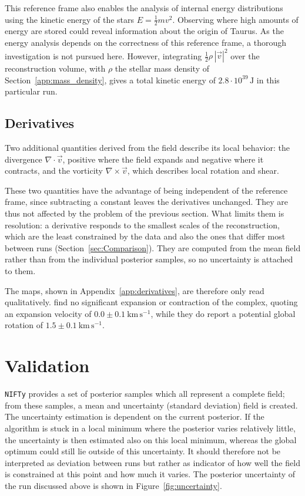 This reference frame also enables the analysis of internal energy distributions using the kinetic energy of the stars $E=\tfrac{1}{2}mv^2$.
Observing where high amounts of energy are stored could reveal information about the origin of Taurus.
As the energy analysis depends on the correctness of this reference frame, a thorough investigation is not pursued here.
However, integrating $\tfrac{1}{2}\rho\,|\vec{v}|^2$ over the reconstruction volume, with $\rho$ the
stellar mass density of Section~\ref{app:mass_density}, gives a total kinetic energy of
$2.8\cdot10^{39}\,\mathrm{J}$ in this particular run.


\subsection{Derivatives}
\label{sec:Derivatives}

Two additional quantities derived from the field describe its local behavior: the divergence $\nabla\cdot\vec{v}$,
positive where the field expands and negative where it contracts, and the vorticity $\nabla\times\vec{v}$,
which describes local rotation and shear.

These two quantities have the advantage of being independent of the reference frame, since subtracting a
constant leaves the derivatives unchanged. They are thus not affected by the problem of the previous
section. What limits them is resolution: a derivative responds to the smallest scales
of the reconstruction, which are the least constrained by the data and also the ones that differ most
between runs (Section~\ref{sec:Comparison}). They are computed from the mean field rather than from the
individual posterior samples, so no uncertainty is attached to them.

The maps, shown in Appendix~\ref{app:derivatives}, are therefore only read qualitatively.
\citet{Galli2019} find no significant expansion or
contraction of the complex, quoting an expansion velocity of $0.0\pm0.1~\mathrm{km\,s^{-1}}$, while they do report a
potential global rotation of $1.5\pm0.1~\mathrm{km\,s^{-1}}$.


\section{Validation}
\label{sec:Validation}
\texttt{NIFTy} provides a set of posterior samples which all represent a complete field; from these samples, a mean and uncertainty (standard deviation) field is created.
The uncertainty estimation is dependent on the current posterior.
If the algorithm is stuck in a local minimum where the posterior varies relatively little, the uncertainty is then estimated also on this local minimum, whereas the global optimum could still lie outside of this uncertainty.
It should therefore not be interpreted as deviation between runs but rather as indicator of how well the field is constrained at this point and how much it varies.
The posterior uncertainty of the run discussed above is shown in Figure~\ref{fig:uncertainty}.

